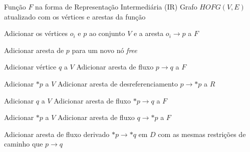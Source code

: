 \documentclass[
    12pt,                %
    openright,           %
    oneside,             %
    a4paper,             %
    english,             %
    brazil               %
]{abntex2}
\begin{document}
\begin{algorithm}[htbp]
\small
\caption{Geração do Grafo de Fluxo de Objetos na \textit{Heap} (HOFG)}
\label{alg:generate_hofg}
\begin{algorithmic}[1]
\Require Função $F$ na forma de Representação Intermediária (IR)
\Ensure Grafo $HOFG(V, E)$ atualizado com os vértices e arestas da função
            
                \State Adicionar os vértices $o_i$ e $p$ ao conjunto $V$ e a aresta $o_i \to p$ a $F$
            \EndIf
            
                    \State Adicionar aresta de $p$ para um novo nó \textit{free}
                \EndIf
            \EndIf
            
                        \State Adicionar vértice $q$ a $V$
                    \EndIf
                    \State Adicionar aresta de fluxo $p \to q$ a $F$
                \EndIf
            \EndIf
            
                        \State Adicionar $*p$ a $V$
                    \EndIf
                    \State Adicionar aresta de desreferenciamento $p \to *p$ a $R$
                \EndIf
            \EndIf
            
                        \State Adicionar $q$ a $V$
                    \EndIf
                    \State Adicionar aresta de fluxo $*p \to q$ a $F$
                \EndIf
            \EndIf
            
                        \State Adicionar $*p$ a $V$
                    \EndIf
                    \State Adicionar aresta de fluxo $q \to *p$ a $F$
                \EndIf
                
                    \State Adicionar aresta de fluxo derivado $*p \to *q$ em $D$ com as mesmas restrições de caminho que $p \to q$
                \EndIf
            \EndIf
            
        \EndFor
    \EndFor
\EndFunction
\end{algorithmic}
\end{algorithm}
\end{document}
